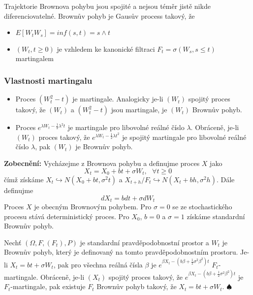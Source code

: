 \documentclass[a4paper]{book}
\begin{document}
Trajektorie Brownova pohybu jsou spojité a nejsou téměr jistě nikde diferenciovatelné. Brownův pohyb je Gausův process takový, že
\begin{itemize}
\item $E[W_t W_s] = inf(s,t) = s \wedge t$
\item $(W_t, t \ge 0)$ je vzhledem ke kanonické filtraci $F_t = \sigma(W_s, s \le t)$ martingalem 
\end{itemize}

\subsubsection{Vlastnosti martingalu}

\begin{itemize}
\item Proces $(W_t^2 - t)$ je martingale. Analogicky je-li $(W_t)$ spojitý proces takový, že $(W_t)$ a $(W_t^2 - t)$ jsou martingale, je $(W_t)$ Brownův pohyb.
\item Proces $e^{\lambda W_t - \frac{1}{2}\lambda^2 t}$ je martingale pro libovolné reálné číslo $\lambda$. Obráceně, je-li $(W_t)$ proces takový, že $e^{\lambda W_t - \frac{1}{2}\lambda t^2}$ je spojitý martingale pro libovolné reálné číslo $\lambda$, pak $(W_t)$ je Brownův pohyb.
\end{itemize}

\noindent \textbf{Zobecnění:} Vycházejme z Brownova pohybu a definujme proces $X$ jako
\begin{equation*}
X_t = X_0 + bt + \sigma W_t, ~~~ \forall t \ge 0
\end{equation*}
čímž získáme $X_t \hookrightarrow N(X_0 + bt, \sigma^2 t)$ a $X_{t + h}/F_t \hookrightarrow N(X_t + bh, \sigma^2 h)$. Dále definujme
\begin{equation*}
d X_t = bdt + \sigma d W_t
\end{equation*}
Proces $X$ je obecným Brownovým pohybem. Pro $\sigma = 0$ se ze stochastického procesu stává deterministický proces. Pro $X_0$, $b = 0$ a $\sigma = 1$ získáme standardní Brownův pohyb.

Nechť $(\Omega, F, (F_t), P)$ je standardní pravděpodobnostní prostor a $W_t$ je Brownův pohyb, který je definovaný na tomto pravděpodobnostním prostoru. Je-li $X_t = bt + \sigma W_t$, pak pro všechna reálná čísla $\beta$ je $e^{\beta X_t - (b \beta + \frac{1}{2} \sigma^2\beta^2)t}$ $F_t$-martingale. Obráceně, je-li $(X_t)$ spojitý proces takový, že $e^{\beta X_t - (b \beta + \frac{1}{2} \sigma^2\beta^2)t}$ je $F_t$-martingale, pak existuje $F_t$ Brownův pohyb takový, že $X_t = bt + \sigma W_t$. $\spadesuit$
\end{document}
